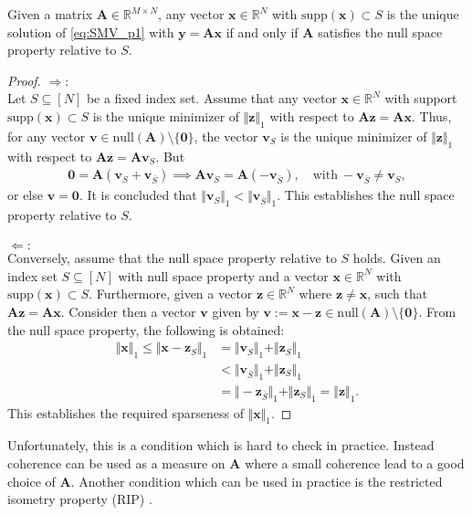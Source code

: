 \begin{theorem}
Given a matrix $\mathbf{A} \in \mathbb{R}^{M \times N}$, any vector $\mathbf{x} \in \mathbb{R}^N$ with $\text{supp}(\mathbf{x}) \subset S$ is the unique solution of \eqref{eq:SMV_p1} with $\mathbf{y} = \mathbf{Ax}$ if and only if $\mathbf{A}$ satisfies the null space property relative to $S$.
\end{theorem}
\begin{proof}
$\Rightarrow:$  \\
Let $S \subseteq [N]$ be a fixed index set. Assume that any vector $\mathbf{x} \in \mathbb{R}^N$ with support $\text{supp}(\mathbf{x})\subset S$ is the unique minimizer of $\Vert \mathbf{z} \Vert_1$ with respect to $\mathbf{Az} = \mathbf{Ax}$. 
Thus, for any vector $\mathbf{v} \in \text{null}(\mathbf{A}) \setminus \{\mathbf{0} \}$, the vector $\mathbf{v}_S$ is the unique minimizer of $\Vert \mathbf{z} \Vert_1$ with respect to $\mathbf{Az} = \mathbf{Av}_S$. 
But 
\begin{align*}
\mathbf{0} = \mathbf{A}(\mathbf{v}_S + \mathbf{v}_{\overline{S}}) \implies \mathbf{Av}_S = \mathbf{A}(-\mathbf{v}_{\overline{S}}), \quad \text{with} \ -\mathbf{v}_{\overline{S}} \neq \mathbf{v}_S,
\end{align*}
or else $\mathbf{v} = \mathbf{0}$. 
It is concluded that $\Vert \mathbf{v}_S \Vert_1 < \Vert \mathbf{v}_{\overline{S}} \Vert_1$. 
This establishes the null space property relative to $S$.
\\ \\
$\Leftarrow:$ \\  
Conversely, assume that the null space property relative to $S$ holds. 
Given an index set $S \subseteq [N]$ with null space property and a vector $\mathbf{x} \in \mathbb{R}^N$ with $\text{supp}(\mathbf{x})\subset S$. Furthermore, given a vector $\mathbf{z} \in \mathbb{R}^N$ where $\mathbf{z} \neq \mathbf{x}$, such that $\mathbf{Az} = \mathbf{Ax}$. Consider then a vector $\mathbf{v}$ given by $\mathbf{v} := \mathbf{x} - \mathbf{z} \in \text{null}(\mathbf{A}) \setminus \{ \mathbf{0} \}$. 
From the null space property, the following is obtained:
\begin{align*}
\Vert \mathbf{x} \Vert_1 \leq \Vert \mathbf{x} - \mathbf{z}_S \Vert_1 &= \Vert \mathbf{v}_S \Vert_1 + \Vert \mathbf{z}_S \Vert_1 \\
&< \Vert \mathbf{v}_{\overline{S}} \Vert_1 + \Vert \mathbf{z}_S \Vert_1 \\
&= \Vert -\mathbf{z}_{\overline{S}} \Vert_1 + \Vert \mathbf{z}_S \Vert_1 = \Vert \mathbf{z} \Vert_1.
\end{align*}
This establishes the required sparseness of $\Vert \mathbf{x} \Vert_1$.
\end{proof}
Unfortunately, this is a condition which is hard to check in practice. Instead coherence can be used as a measure on $\mathbf{A}$ where a small coherence lead to a good choice of $\mathbf{A}$. Another condition which can be used in practice is the restricted isometry property (RIP) \cite{??}.

